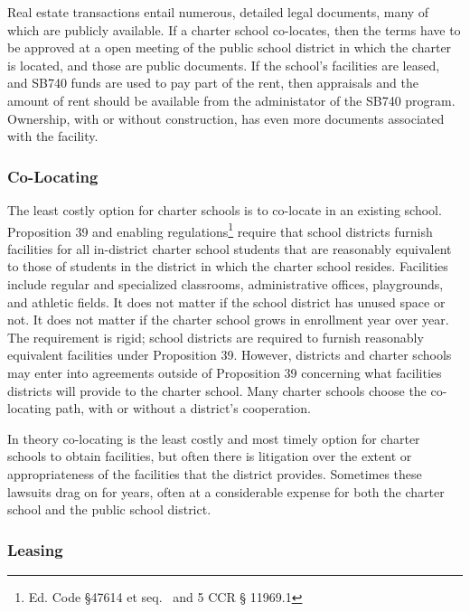 Real estate transactions entail numerous, detailed legal documents, many of which are publicly available. If a charter school co-locates, then the terms have to be approved at a open meeting of the public school district in which the charter is located, and those are public documents. If the school's facilities are leased, and SB740 funds are used to pay part of the rent, then appraisals and the amount of rent should be available from the administator of the SB740 program. Ownership, with or without construction, has even more documents associated with the facility.

\subsubsection{Co-Locating}\label{sec:co-locating}\indent%

The least costly option for charter schools is to co-locate in an existing school. Proposition 39 and enabling regulations\footnote{Ed. Code §47614 et seq.  and 5 CCR § 11969.1} require that school districts furnish facilities for all in-district charter school students that are reasonably equivalent to those of students in the district in which the charter school resides. Facilities include regular and specialized classrooms, administrative offices, playgrounds, and athletic fields. It does not matter if the school district has unused space or not. It does not matter if the charter school grows in enrollment year over year. The requirement is rigid; school districts are required to furnish reasonably equivalent facilities under Proposition 39. However, districts and charter schools may enter into agreements outside of Proposition 39 concerning what facilities districts will provide to the charter school. Many charter schools choose the co-locating path, with or without a district's cooperation.

In theory co-locating is the least costly and most timely option for charter schools to obtain facilities, but often there is litigation over the extent or appropriateness of the facilities that the district provides. Sometimes these lawsuits drag on for years, often at a considerable expense for both the charter school and the public school district.

\newpage
\subsubsection{Leasing}\label{sec:leasing}\indent%

